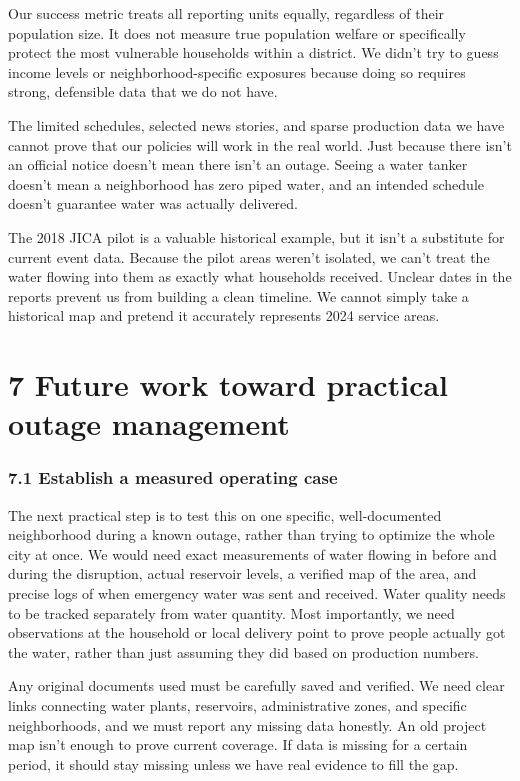 \documentclass[conference]{IEEEtran}
\begin{document}
Our success metric treats all reporting units equally, regardless of their population size. It does not measure true population welfare or specifically protect the most vulnerable households within a district. We didn't try to guess income levels or neighborhood-specific exposures because doing so requires strong, defensible data that we do not have.

The limited schedules, selected news stories, and sparse production data we have cannot prove that our policies will work in the real world. Just because there isn't an official notice doesn't mean there isn't an outage. Seeing a water tanker doesn't mean a neighborhood has zero piped water, and an intended schedule doesn't guarantee water was actually delivered.

The 2018 JICA pilot is a valuable historical example, but it isn't a substitute for current event data. Because the pilot areas weren't isolated, we can't treat the water flowing into them as exactly what households received. Unclear dates in the reports prevent us from building a clean timeline. We cannot simply take a historical map and pretend it accurately represents 2024 service areas.

\section{7 Future work toward practical outage management}
\subsubsection{7.1 Establish a measured operating case}
The next practical step is to test this on one specific, well-documented neighborhood during a known outage, rather than trying to optimize the whole city at once. We would need exact measurements of water flowing in before and during the disruption, actual reservoir levels, a verified map of the area, and precise logs of when emergency water was sent and received. Water quality needs to be tracked separately from water quantity. Most importantly, we need observations at the household or local delivery point to prove people actually got the water, rather than just assuming they did based on production numbers.

Any original documents used must be carefully saved and verified. We need clear links connecting water plants, reservoirs, administrative zones, and specific neighborhoods, and we must report any missing data honestly. An old project map isn't enough to prove current coverage. If data is missing for a certain period, it should stay missing unless we have real evidence to fill the gap.
\end{document}
